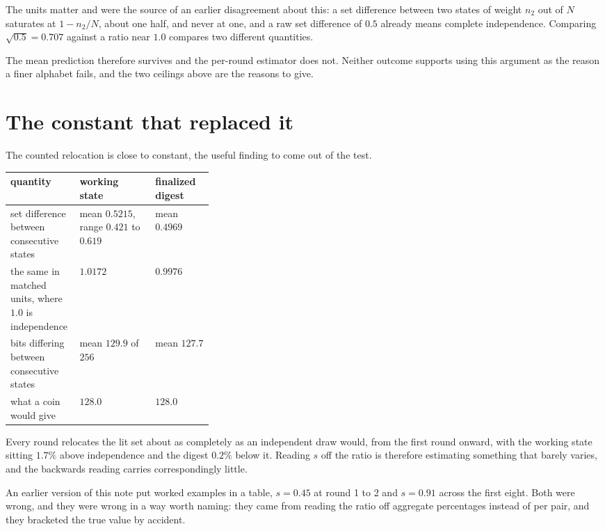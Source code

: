 The units matter and were the source of an earlier disagreement about this: a set difference between two states of weight \(n_2\) out of \(N\) saturates at \(1 - n_2/N\), about one half, and never at one, and a raw set difference of \(0.5\) already means complete independence. Comparing \(\sqrt{0.5} = 0.707\) against a ratio near \(1.0\) compares two different quantities.

The mean prediction therefore survives and the per-round estimator does not. Neither outcome supports using this argument as the reason a finer alphabet fails, and the two ceilings above are the reasons to give.

\section{The constant that replaced it}

The counted relocation is close to constant, the useful finding to come out of the test.

\begin{center}
\begin{tabular}{@{}p{0.34\linewidth}ll@{}}
\toprule
quantity & working state & finalized digest \\
\midrule
set difference between consecutive states & mean \(0.5215\), range \(0.421\) to \(0.619\) & mean \(0.4969\) \\
the same in matched units, where \(1.0\) is independence & \(1.0172\) & \(0.9976\) \\
bits differing between consecutive states & mean \(129.9\) of \(256\) & mean \(127.7\) \\
what a coin would give & \(128.0\) & \(128.0\) \\
\bottomrule
\end{tabular}
\end{center}

Every round relocates the lit set about as completely as an independent draw would, from the first round onward, with the working state sitting \(1.7\%\) above independence and the digest \(0.2\%\) below it. Reading \(s\) off the ratio is therefore estimating something that barely varies, and the backwards reading carries correspondingly little.

An earlier version of this note put worked examples in a table, \(s = 0.45\) at round 1 to 2 and \(s = 0.91\) across the first eight. Both were wrong, and they were wrong in a way worth naming: they came from reading the ratio off aggregate percentages instead of per pair, and they bracketed the true value by accident.

